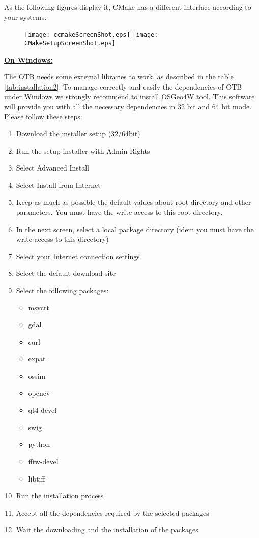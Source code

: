 As the following figures display it, CMake has a different interface according to your systems.
\label{sec:ConfiguringOTBwithVTK}

\begin{figure}[ht]
\centering
\texttt{[image: ccmakeScreenShot.eps]}
\texttt{[image: CMakeSetupScreenShot.eps]}
\label{fig:CMakeGUI}
\end{figure}


\textbf{\underline{On Windows:}}

The OTB needs some external libraries to work, as described in the table \ref{tab:installation2}. To manage correctly and easily the dependencies of OTB under Windows we strongly recommend to install \href{http://trac.osgeo.org/osgeo4w/}{OSGeo4W} tool. This software will provide you with all the necessary dependencies in 32 bit and 64 bit mode. Please follow these steps:
\begin{enumerate}
\item  Download the installer setup (32/64bit)
\item  Run the setup installer with Admin Rights
\item  Select Advanced Install
\item  Select Install from Internet
\item  Keep as much as possible the default values about root directory and other parameters. You must have the write access to this root directory. 
\item  In the next screen, select a local package directory (idem you must have the write access to this directory)
\item  Select your Internet connection settings
\item  Select the default download site
\item  Select the following packages:
	\begin{itemize}
	\item  msvcrt
	\item  gdal
	\item  curl
	\item  expat 
	\item  ossim
	\item  opencv
	\item  qt4-devel
	\item  swig
	\item  python
	\item  fftw-devel
	\item  libtiff
	\end{itemize}
\item  Run the installation process
\item  Accept all the dependencies required by the selected packages
\item  Wait the downloading and the installation of the packages
\end{enumerate}

